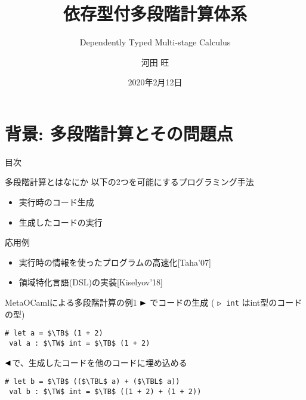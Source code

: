 \documentclass[dvipdfmx,aspectratio=169, 20pt]{beamer}
\title{依存型付多段階計算体系}
\subtitle{Dependently Typed Multi-stage Calculus}
\author{河田 旺}
\institute{五十嵐・末永研究室}
\date{2020年2月12日}
\begin{document}
\maketitle



\section{背景: 多段階計算とその問題点}

%
%

\begin{frame}{目次}
    \tableofcontents[currentsection]
\end{frame}

\begin{frame}[fragile]{多段階計算とはなにか}
    以下の2つを可能にするプログラミング手法
    \begin{itemize}
        \item 実行時のコード生成
        \item 生成したコードの実行
    \end{itemize}
    応用例
    \begin{itemize}
        \item 実行時の情報を使ったプログラムの高速化[Taha'07]
        \item 領域特化言語(DSL)の実装[Kiselyov'18]
    \end{itemize}
\end{frame}

\begin{frame}[fragile]{MetaOCamlによる多段階計算の例1}
    \( {\mathop{\blacktriangleright}} \) でコードの生成 ( \( {\mathop{\triangleright}} \)\ \verb|int| はint型のコードの型)
    \begin{exampleblock}{}
        \begin{Verbatim}[commandchars=\\\{\},codes={\catcode`$=3\catcode`^=7}]
 # let a = $\TB$ (1 + 2)
 val a : $\TW$ int = $\TB$ (1 + 2)
        \end{Verbatim}
    \end{exampleblock}
    \( {\mathop{\blacktriangleleft}} \)で、生成したコードを他のコードに埋め込める
    \begin{exampleblock}{}
        \begin{Verbatim}[commandchars=\\\{\},codes={\catcode`$=3\catcode`^=7}]
 # let b = $\TB$ (($\TBL$ a) + ($\TBL$ a))
 val b : $\TW$ int = $\TB$ ((1 + 2) + (1 + 2))
        \end{Verbatim}
    \end{exampleblock}
\end{frame}
\end{document}
